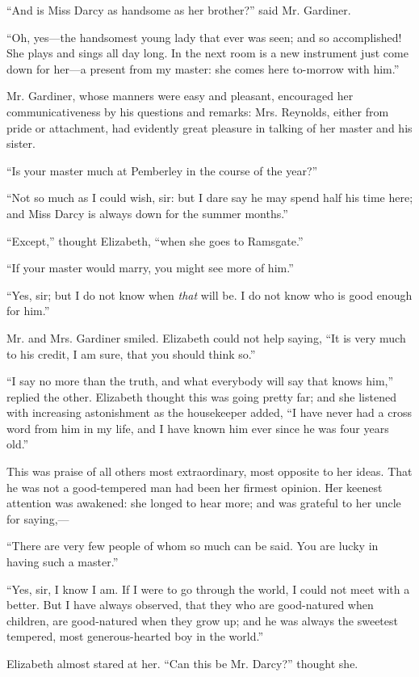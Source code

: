\documentclass[12pt,openright]{book}
\begin{document}
“And is Miss Darcy as handsome as her brother?” said Mr. Gardiner.

“Oh, yes—the handsomest young lady that ever was seen; and so accomplished! She plays and sings all day long. In the next room is a new instrument just come down for her—a present from my master: she comes here to-morrow with him.”

Mr. Gardiner, whose manners were easy and pleasant, encouraged her communicativeness by his questions and remarks: Mrs. Reynolds, either from pride or attachment, had evidently great pleasure in talking of her master and his sister.

“Is your master much at Pemberley in the course of the year?”

“Not so much as I could wish, sir: but I dare say he may spend half his time here; and Miss Darcy is always down for the summer months.”

“Except,” thought Elizabeth, “when she goes to Ramsgate.”

“If your master would marry, you might see more of him.”

“Yes, sir; but I do not know when \textit{that} will be. I do not know who is good enough for him.”

Mr. and Mrs. Gardiner smiled. Elizabeth could not help saying, “It is very much to his credit, I am sure, that you should think so.”

“I say no more than the truth, and what everybody will say that knows him,” replied the other. Elizabeth thought this was going pretty far; and she listened with increasing astonishment as the housekeeper added, “I have never had a cross word from him in my life, and I have known him ever since he was four years old.”

This was praise of all others most extraordinary, most opposite to her ideas. That he was not a good-tempered man had been her firmest opinion. Her keenest attention was awakened: she longed to hear more; and was grateful to her uncle for saying,—

“There are very few people of whom so much can be said. You are lucky in having such a master.”

“Yes, sir, I know I am. If I were to go through the world, I could not meet with a better. But I have always observed, that they who are good-natured when children, are good-natured when they grow up; and he was always the sweetest tempered, most generous-hearted boy in the world.”

Elizabeth almost stared at her. “Can this be Mr. Darcy?” thought she.
\end{document}
